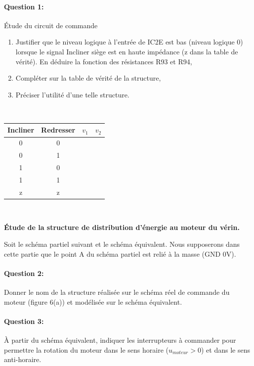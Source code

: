 \paragraph{Question 1:} Étude du circuit de commande
\begin{enumerate}
 \item Justifier que le niveau logique à l'entrée de IC2E est bas (niveau logique 0) lorsque le signal \og Incliner siège \fg est en haute impédance (\og z \fg dans la table de vérité). En déduire la fonction des résistances R93 et R94,
 \item Compléter sur la table de vérité de la structure,
 \item Préciser l'utilité d'une telle structure.
\end{enumerate}

~\

\begin{center}
\begin{tabular}{|c|c|c|c|}
\hline
Incliner & Redresser & $v_1$ & $v_2$ \\
\hline
0 & 0 &  &  \\
\hline
0 & 1 &  &  \\
\hline
1 & 0 &  &  \\
\hline
1 & 1 &  &  \\
\hline
z & z &  &  \\
\hline
\end{tabular}
\end{center}

~\

\textbf{Étude de la structure de distribution d'énergie au moteur du vérin.}

Soit le schéma partiel suivant et le schéma équivalent. Nous supposerons dans cette partie que le point A du schéma partiel est relié à la masse (GND 0V). 

\paragraph{Question 2:} Donner le nom de la structure réalisée sur le schéma réel de commande du moteur (figure 6(a)) et modélisée sur le schéma équivalent.

\paragraph{Question 3:} À partir du schéma équivalent, indiquer les interrupteurs à commander pour permettre la rotation du moteur dans le sens horaire ($u_{moteur}>0$) et dans le sens anti-horaire.

